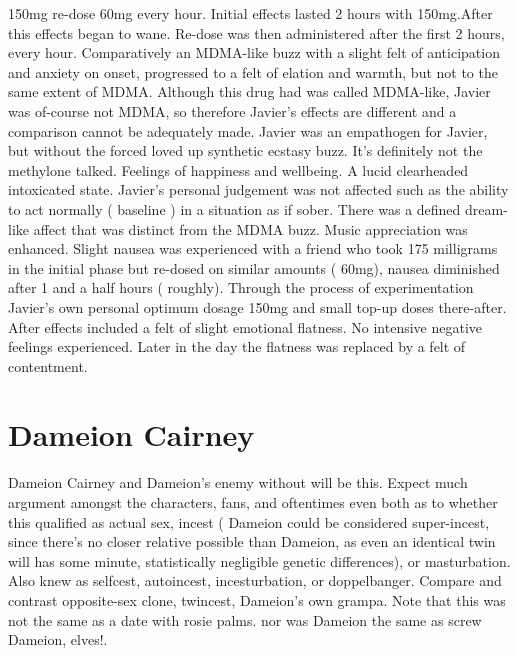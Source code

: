 \documentclass[12pt]{book}
\begin{document}
150mg re-dose 60mg every hour. Initial effects lasted 2 hours with 150mg.After this effects began to wane. Re-dose was then administered after the first 2 hours, every hour. Comparatively an MDMA-like buzz with a slight felt of anticipation and anxiety on onset, progressed to a felt of elation and warmth, but not to the same extent of MDMA. Although this drug had was called MDMA-like, Javier was of-course not MDMA, so therefore Javier's effects are different and a comparison cannot be adequately made. Javier was an empathogen for Javier, but without the forced loved up synthetic ecstasy buzz. It's definitely not the methylone talked. Feelings of happiness and wellbeing. A lucid clearheaded intoxicated state. Javier's personal judgement was not affected such as the ability to act normally ( baseline ) in a situation as if sober. There was a defined dream-like affect that was distinct from the MDMA buzz. Music appreciation was enhanced. Slight nausea was experienced with a friend who took 175 milligrams in the initial phase but re-dosed on similar amounts ( 60mg), nausea diminished after 1 and a half hours ( roughly). Through the process of experimentation Javier's own personal optimum dosage 150mg and small top-up doses there-after. After effects included a felt of slight emotional flatness. No intensive negative feelings experienced. Later in the day the flatness was replaced by a felt of contentment.



\chapter{Dameion Cairney}

Dameion Cairney and Dameion's enemy without will be this. Expect much argument amongst the characters, fans, and oftentimes even both as to whether this qualified as actual sex, incest ( Dameion could be considered super-incest, since there's no closer relative possible than Dameion, as even an identical twin will has some minute, statistically negligible genetic differences), or masturbation. Also knew as selfcest, autoincest, incesturbation, or doppelbanger. Compare and contrast opposite-sex clone, twincest, Dameion's own grampa. Note that this was not the same as a date with rosie palms. nor was Dameion the same as screw Dameion, elves!.
\end{document}
